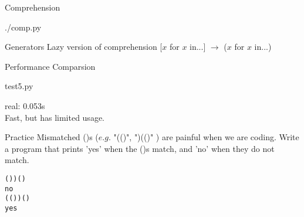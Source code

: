 \documentclass{beamer}
\begin{document}
\begin{frame}[fragile]{Comprehension}
  \begin{lstinputlisting}
    {./comp.py}
  \end{lstinputlisting}
\end{frame}

\begin{frame}[fragile]{Generators}
  Lazy version of comprehension [$x$ for $x$ in...] $\rightarrow$ ($x$ for $x$ in...)
\end{frame}

\begin{frame}[fragile]{Performance Comparsion}
  \begin{lstinputlisting}
  {test5.py}
  \end{lstinputlisting}
  real: 0.053s\\
  Fast, but has limited usage.
\end{frame}

\begin{frame}[fragile]{Practice}
Mismatched ()s ($e.g.$ "(()", ")(()" ) are painful when we are coding. Write a
program that prints 'yes' when the ()s match, and 'no' when they do not match.
\begin{lstlisting}
())()
no
(())()
yes
\end{lstlisting}
\end{frame}
\end{document}
